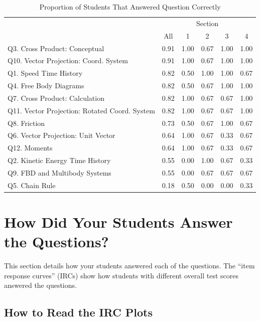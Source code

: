 \documentclass[11pt,letterpaper]{article}\usepackage[]{graphicx}\usepackage[]{color}
\begin{document}

\begin{table}[ht]
\centering
\caption{Proportion of Students That Answered Question Correctly} 
\label{table:questStats}
\begin{tabular}{lccccc}
  \toprule 
 & \multicolumn{5}{c}{Section}\\
 \cline{2-6} 
 & All & 1 & 2 & 3 & 4 \\ 
  \midrule 
Q3. Cross Product: Conceptual & 0.91 & 1.00 & 0.67 & 1.00 & 1.00 \\ 
  Q10. Vector Projection: Coord. System & 0.91 & 1.00 & 0.67 & 1.00 & 1.00 \\ 
  Q1. Speed Time History & 0.82 & 0.50 & 1.00 & 1.00 & 0.67 \\ 
  Q4. Free Body Diagrams & 0.82 & 0.50 & 0.67 & 1.00 & 1.00 \\ 
  Q7. Cross Product: Calculation & 0.82 & 1.00 & 0.67 & 0.67 & 1.00 \\ 
  Q11. Vector Projection: Rotated Coord. System & 0.82 & 1.00 & 0.67 & 0.67 & 1.00 \\ 
  Q8. Friction & 0.73 & 0.50 & 0.67 & 1.00 & 0.67 \\ 
  Q6. Vector Projection: Unit Vector & 0.64 & 1.00 & 0.67 & 0.33 & 0.67 \\ 
  Q12. Moments & 0.64 & 1.00 & 0.67 & 0.33 & 0.67 \\ 
  Q2. Kinetic Energy Time History & 0.55 & 0.00 & 1.00 & 0.67 & 0.33 \\ 
  Q9. FBD and Multibody Systems & 0.55 & 0.00 & 0.67 & 0.67 & 0.67 \\ 
  Q5. Chain Rule & 0.18 & 0.50 & 0.00 & 0.00 & 0.33 \\ 
   \bottomrule 
\end{tabular}
\end{table}


\newpage

\section*{How Did Your Students Answer the Questions?}
This section details how your students answered each of the questions.  The ``item response curves'' (IRCs) show how students with different overall test scores answered the questions.  

\subsection*{How to Read the IRC Plots}
\end{document}
